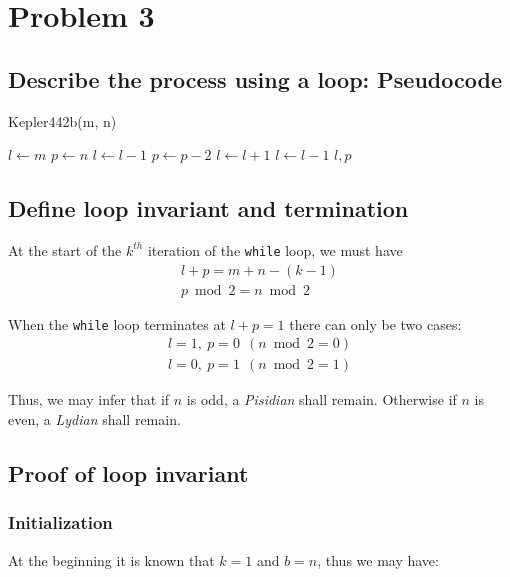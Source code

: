 \documentclass[12pt]{article}
\newcommand{\inlinecode}{\texttt}
\begin{document}
\newpage
\section{Problem 3}
\subsection{Describe the process using a loop: Pseudocode}

\begin{algorithm}
\caption{Kepler442b(m, n)}\label{Kepler442b}
\begin{algorithmic}[1]
\Procedure{}{}
\State $l \gets m$
\State $p \gets n$
    \State {}
        \State $l \gets l - 1$
        \State $p \gets p - 2$
        \State $l \gets l + 1$
    \Else
        \State $l \gets l - 1$
    \EndIf
\EndWhile
\State \Return $l, p$
\EndProcedure
\end{algorithmic}
\end{algorithm}

\subsection{Define loop invariant and termination}
At the start of the $k^{th}$ iteration of the \inlinecode{while} loop, we must have
\begin{gather}
    l + p = m + n - (k - 1) \\
    p\bmod 2 = n \bmod 2
\end{gather}

When the \inlinecode{while} loop terminates at $l + p = 1$ there can only be two cases:
\begin{gather}
    l = 1, \ p = 0 \ \ (n \bmod 2 = 0) \\
    l = 0, \ p = 1 \ \ (n \bmod 2 = 1)
\end{gather}

Thus, we may infer that if $n$ is odd, a \textit{Pisidian} shall remain. Otherwise if $n$ is even, a \textit{Lydian} shall remain.

\subsection{Proof of loop invariant}
\subsubsection{Initialization}
At the beginning it is known that $k = 1$ and $b = n$, thus we may have:
\end{document}
